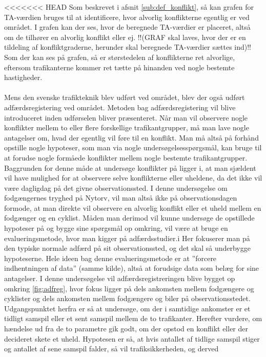 <<<<<<< HEAD
Som beskrevet i afsnit \cref{sub:def_konflikt}, så kan grafen for TA-værdien bruges til at identificere, hvor alvorlig konflikterne egentlig er ved området. I grafen kan der ses, hvor de beregnede TA-værdier er placeret, altså om de tilhører en alvorlig konflikt eller ej.
!!(GRAF skal laves, hvor der er en tildeling af konfliktgraderne, herunder skal beregnede TA-værdier sættes ind)!!
Som der kan ses på grafen, så er størstedelen af konflikterne ret alvorlige, eftersom trafikanterne kommer ret tætte på hinanden ved nogle bestemte hastigheder.
\\\\
Mens den svenske trafikteknik blev udført ved området, blev der også udført adfærdsregistering ved området. Metoden bag adfærdsregistering vil blive introduceret inden udførselen bliver præsenteret.
Når	man	vil	observere nogle	konflikter mellem to eller flere	forskellige trafikantgrupper,	må man lave	nogle antagelser	om, hvad	 der egentlig vil føre til en konflikt. Man må altså	på	forhånd	opstille nogle hypoteser, som man via nogle undersøgelsesspørgsmål, kan bruge til	at forudse nogle	formåede	konflikter mellem nogle bestemte	trafikantgrupper.	Baggrunden for denne	måde at	undersøge konflikter	på ligger i,	at man sjældent 	vil	have	mulighed	 for at	observere selve konflikterne	eller uheldene, da det ikke	vil	være	 dagligdag på	 det	 givne observationssted.	I denne	undersøgelse om	fodgængernes tryghed på	Nytorv,	vil man altså ikke på observationsdagen formode,	at man direkte vil observere en alvorlig	 konflikt eller	et uheld mellem	en fodgænger og	en cyklist.	Måden man derimod	vil	kunne undersøge	de opstillede hypoteser på og bygge sine	spørgsmål op omkring, vil	være	at bruge en	evalueringsmetode, hvor	man	kigger på adfærdsstudier.i Her fokuserer	man	på den typiske normale adfærd på	sit observationssted, og	det skal så	underbygge	hypoteserne. Hele ideen bag denne evalueringsmetode er at ”forcere indhentningen af data”	(samme	kilde),	altså at forudsige data	som	belæg for sine antagelser.
I denne undersøgelse vil	adfærdsregistreringen blive bygget op omkring	 \cref{fig:adfreg},	hvor fokus ligger på dels ankomsten mellem fodgængere	 og cyklister og dels ankomsten mellem	fodgængere og biler på observationsstedet. Udgangspunktet herfra er så at	undersøge, om	der i samtidige ankomster er	et tidligt samspil eller	et sent samspil mellem de to trafikanter.
Herefter vurdere, om hændelse ud fra	de to parametre gik godt, om	der	opstod en konflikt	eller der decideret skete et	uheld. Hypotesen er	så,	at hvis	antallet	 af	tidlige
samspil stiger og antallet af sene samspil falder, så vil trafiksikkerheden, og derved
